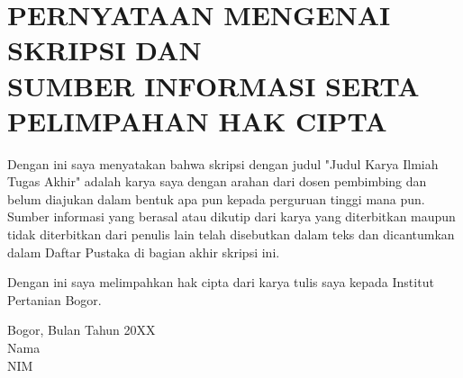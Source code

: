 
\chapter*{PERNYATAAN MENGENAI SKRIPSI DAN\\
SUMBER INFORMASI SERTA PELIMPAHAN HAK CIPTA}
\thispagestyle{empty}

Dengan ini saya menyatakan bahwa skripsi dengan judul
"Judul Karya Ilmiah Tugas Akhir"
adalah karya saya dengan arahan dari dosen pembimbing dan belum diajukan
dalam bentuk apa pun kepada perguruan tinggi mana pun.
Sumber informasi yang berasal atau dikutip dari karya yang diterbitkan
maupun tidak diterbitkan dari penulis lain telah disebutkan dalam teks
dan dicantumkan dalam Daftar Pustaka di bagian akhir skripsi ini.

Dengan ini saya melimpahkan hak cipta dari karya tulis saya kepada
Institut Pertanian Bogor.

\vspace{\baselineskip}

\begin{flushright}
Bogor, Bulan Tahun 20XX\\[\baselineskip]
Nama\\
NIM
\end{flushright}
